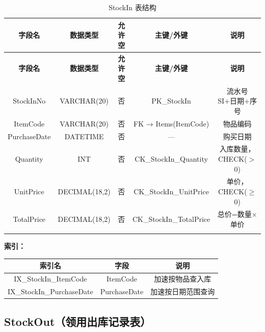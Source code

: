 \documentclass[12pt,a4paper]{ctexart}
\begin{document}
\begin{longtable}{c|c|c|c|c}
\toprule
\textbf{字段名} & \textbf{数据类型} & \textbf{允许空} & \textbf{主键/外键} & \textbf{说明} \\
\midrule
\endfirsthead
\toprule
\textbf{字段名} & \textbf{数据类型} & \textbf{允许空} & \textbf{主键/外键} & \textbf{说明} \\
\midrule
\endhead
StockInNo    & VARCHAR(20)    & 否 & PK\_StockIn              & 流水号 SI+日期+序号 \\
ItemCode     & VARCHAR(20)    & 否 & FK → Items(ItemCode)     & 物品编码 \\
PurchaseDate & DATETIME       & 否 & —                        & 购买日期 \\
Quantity     & INT            & 否 & CK\_StockIn\_Quantity     & 入库数量，CHECK($>$0) \\
UnitPrice    & DECIMAL(18,2)  & 否 & CK\_StockIn\_UnitPrice    & 单价，CHECK($\geq$0) \\
TotalPrice   & DECIMAL(18,2)  & 否 & CK\_StockIn\_TotalPrice   & 总价=数量×单价 \\
\bottomrule
\caption{StockIn 表结构}
\end{longtable}

\vspace{4pt}
\textbf{索引：}

\begin{tabular}{c|c|c}
\toprule
\textbf{索引名} & \textbf{字段} & \textbf{说明} \\
\midrule
IX\_StockIn\_ItemCode     & ItemCode      & 加速按物品查入库 \\
IX\_StockIn\_PurchaseDate & PurchaseDate  & 加速按日期范围查询 \\
\bottomrule
\end{tabular}

\subsection{StockOut（领用出库记录表）}
\end{document}
